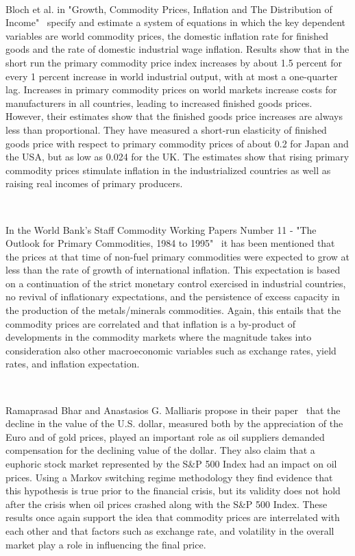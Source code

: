 \documentclass{article}
\begin{document}
\

Bloch et al. in "Growth, Commodity Prices, Inflation and The Distribution of Income"~\cite{bloch2007growth} specify and estimate a system of equations in which the key dependent variables are world commodity prices, the domestic inflation rate for finished goods and the rate of domestic industrial wage inflation.  Results show that in the short run the primary commodity price index increases by about 1.5 percent for every 1 percent increase in world industrial output, with at most a one-quarter lag. Increases in primary commodity prices on world markets increase costs for manufacturers in all countries, leading to increased finished goods prices. However, their estimates show that the finished goods price increases are always less than proportional. They have measured a short-run elasticity of finished goods price with respect to primary commodity prices of about 0.2 for Japan and the USA, but as low as 0.024 for the UK. The estimates show that rising primary commodity prices stimulate inflation in the industrialized countries as well as raising real incomes of primary producers.

\

In the World Bank's Staff Commodity Working Papers Number 11 - "The Outlook for Primary Commodities, 1984 to 1995"~\cite{duncan1984outlook} it has been mentioned that the prices at that time of non-fuel primary commodities were expected to grow at less than the rate of growth of international inflation. This expectation is based on a continuation of the strict monetary control exercised in industrial countries, no revival of inflationary expectations, and the persistence of excess capacity in the production of the metals/minerals commodities. Again, this entails that the commodity prices are correlated and that inflation is a by-product of developments in the commodity markets where the magnitude takes into consideration also other macroeconomic variables such as exchange rates, yield rates, and inflation expectation. 

\

Ramaprasad Bhar and Anastasios G. Malliaris propose in their paper~\cite{malliaris2011dividends} that the decline in the value of the U.S. dollar, measured both by the appreciation of the Euro and of gold prices, played an important role as oil suppliers demanded compensation for the declining value of the dollar. They also claim that a euphoric stock market represented by the S\&P 500 Index had an impact on oil prices. Using a Markov switching regime methodology they find evidence that this hypothesis is true prior to the financial crisis, but its validity does not hold after the crisis when oil prices crashed along with the S\&P 500 Index. These results once again support the idea that commodity prices are interrelated with each other and that factors such as exchange rate, and volatility in the overall market play a role in influencing the final price. 
\end{document}
